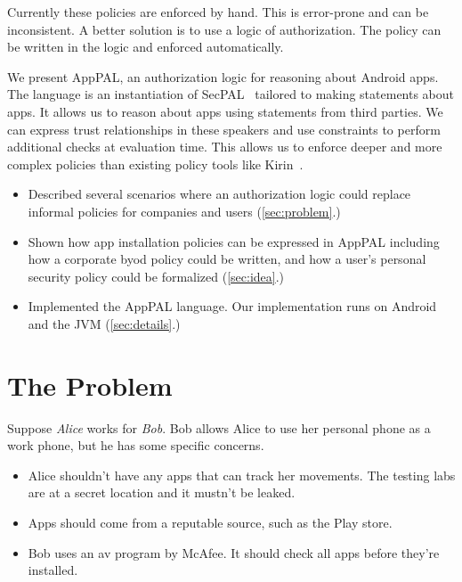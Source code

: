 \documentclass[a4paper]{scrartcl}
\newcommand{\comment}[1]{}%
\begin{document}
Currently these policies are enforced by hand.
This is error-prone and can be inconsistent.
A better solution is to use a logic of authorization.
The policy can be written in the logic and enforced automatically.


We present AppPAL, an authorization logic for reasoning about Android apps.
The language is an instantiation of SecPAL~\citep{Becker:2006vh} tailored to making statements about apps.
It allows us to reason about apps using statements from third parties.
We can express trust relationships in these speakers and use constraints to perform additional checks at evaluation time.
This allows us to enforce deeper and more complex policies than existing policy tools like Kirin~\citep{Enck:2009ko}.

\begin{itemize}
  \item Described several scenarios where an authorization logic could replace informal policies for companies and users (\autoref{sec:problem}.) 
    \comment{Provide forward refs saying where we do this and about what}
  \item Shown how app installation policies can be expressed in AppPAL
    including how a corporate \ac{byod} policy could be written, and how a user's personal security policy could be formalized (\autoref{sec:idea}.)
  \item Implemented the AppPAL language.  
    Our implementation runs on Android and the JVM (\autoref{sec:details}.)
\end{itemize}

\section{The Problem\comment{1 page}}
\label{sec:problem}

Suppose \emph{Alice} works for \emph{Bob}.
Bob allows Alice to use her personal phone as a work phone, but he has some specific concerns.
\begin{itemize}
  \item Alice shouldn't have any apps that can track her movements.
    The testing labs are at a secret location and it mustn't be leaked.
  \item Apps should come from a reputable source, such as the Play store.
  \item Bob uses an \ac{av} program by McAfee. 
    It should check all apps before they're installed.
\end{itemize}
\end{document}

